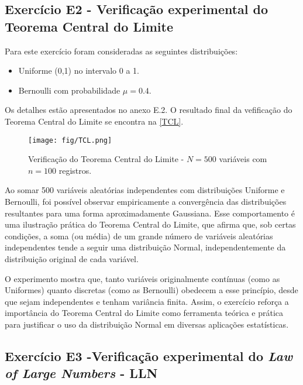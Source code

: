 \documentclass{article}
\begin{document}
 \subsection{ Exerc\'icio E2 - Verifica{\c c}\~ao experimental do Teorema Central do Limite}
 
  Para este exercício foram consideradas as seguintes distribuições:
  
  \begin{itemize}
  	\item Uniforme (0,1) no intervalo 0 a 1.
  	\item Bernoulli com probabilidade $\mu=0.4$. 
  \end{itemize}
  
  Os detalhes estão apresentados no anexo E.2. O  resultado final da vefificação do Teorema Central do Limite se encontra na \autoref{TCL}.
  
  \begin{figure}[ht]
  	\centering %
  	\texttt{[image: fig/TCL.png]} %
  	\caption{Verificação do Teorema Central do Limite - $N=500$ variáveis com $n=100$ registros.} %
  	\label{TCL} %
  \end{figure} 
  
  Ao somar 500 variáveis aleatórias independentes com distribuições Uniforme e Bernoulli, foi possível observar empiricamente a convergência das distribuições resultantes para uma forma aproximadamente Gaussiana. Esse comportamento é uma ilustração prática do Teorema Central do Limite, que afirma que, sob certas condições, a soma (ou média) de um grande número de variáveis aleatórias independentes tende a seguir uma distribuição Normal, independentemente da distribuição original de cada variável.
  
  O experimento mostra que, tanto variáveis originalmente contínuas (como as Uniformes) quanto discretas (como as Bernoulli) obedecem a esse princípio, desde que sejam independentes e tenham variância finita. Assim, o exercício reforça a importância do Teorema Central do Limite como ferramenta teórica e prática para justificar o uso da distribuição Normal em diversas aplicações estatísticas.
  
  
 \subsection{ Exerc\'icio E3 -Verifica{\c c}\~ao experimental do \textit{Law of Large Numbers} - LLN}
  
\end{document}
